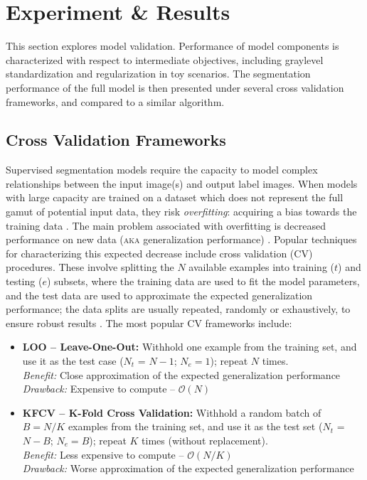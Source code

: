 \chapter{Experiment \& Results}
This section explores model validation. Performance of model components is characterized with respect to intermediate objectives, including graylevel standardization and regularization in toy scenarios. The segmentation performance of the full model is then presented under several cross validation frameworks, and compared to a similar algorithm.
\section{Cross Validation Frameworks}\label{s:CVframeworks}
Supervised segmentation models require the capacity to model complex relationships between the input image(s) and output label images. When models with large capacity are trained on a dataset which does not represent the full gamut of potential input data, they risk \textit{overfitting}: acquiring a bias towards the training data \cite{Hawkins2004}. The main problem associated with overfitting is decreased performance on new data (\textsc{aka} generalization performance) \cite{Hawkins2004}. Popular techniques for characterizing this expected decrease include cross validation (CV) procedures. These involve splitting the $N$ available examples into training ($t$) and testing ($e$) subsets, where the training data are used to fit the model parameters, and the test data are used to approximate the expected generalization performance; the data splits are usually repeated, randomly or exhaustively, to ensure robust results \cite{Arlot2010}. The most popular CV frameworks include:
\begin{itemize}
  \item \textbf{LOO -- Leave-One-Out:} Withhold one example from the training set, and use it as the test case ($N_t$ = $N-1$; $N_e = 1$); repeat $N$ times.
  \\\textit{Benefit:} Close approximation of the expected generalization performance
  \\\textit{Drawback:} Expensive to compute -- $\mathcal{O}(N)$
  \item \textbf{KFCV -- K-Fold Cross Validation:} Withhold a random batch of $B = N/K$ examples from the training set, and use it as the test set ($N_t$ = $N-B$; $N_e = B$); repeat $K$ times (without replacement).
  \\\textit{Benefit:} Less expensive to compute -- $\mathcal{O}(N/K)$
  \\\textit{Drawback:} Worse approximation of the expected generalization performance
\end{itemize}
